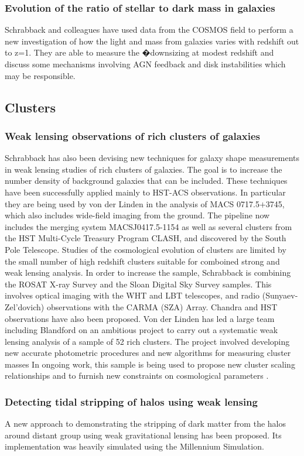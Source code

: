 \documentclass[psfig,11pt]{article}
\begin{document}
{\subsubsection{Evolution of the ratio of stellar to dark mass in galaxies}
Schrabback and colleagues have used data from the COSMOS field to perform a new investigation of how the light and mass from galaxies varies with redshift out to z=1. They are able to measure the �downsizing at modest redshift and discuss some mechanisms involving AGN feedback and disk instabilities which may be responsible.
\subsection{Clusters}
\subsubsection{Weak lensing observations of rich clusters of galaxies}
Schrabback has also been devising new techniques for galaxy shape measurements in weak lensing studies of rich clusters of galaxies. The goal is to increase the number density of background galaxies that can be included. These techniques have been successfully applied mainly to HST-ACS observations. In particular they are being used by von der Linden in the analysis of MACS 0717.5$+$3745, which also includes wide-field imaging from the ground. The pipeline now includes the merging system MACSJ0417.5-1154 as well as several clusters from the HST Multi-Cycle Treasury Program CLASH, and discovered by the South Pole Telescope. Studies of the cosmological evolution of clusters are limited by the small number of high redshift clusters suitable for comboined strong and weak lensing analysis. In order to increase the sample, Schrabback is combining the ROSAT X-ray Survey and the Sloan Digital Sky Survey samples. This involves optical imaging with the WHT and LBT telescopes, and radio (Sunyaev-Zel'dovich) observations with the CARMA (SZA) Array. Chandra and HST observations have also been proposed. Von der Linden has led a large team including Blandford on an ambitious project to carry out a systematic weak lensing analysis of a sample of 52 rich clusters. The project involved developing  new accurate photometric procedures and  new algorithms for measuring cluster masses In ongoing work, this sample is being used to propose new cluster scaling relationships and to furnish new constraints on cosmological parameters .
\subsubsection{Detecting tidal stripping of halos using weak lensing}
A new approach to demonstrating the stripping of dark matter from the halos around distant group using weak gravitational lensing has been proposed. Its implementation was heavily simulated using the Millennium Simulation.
}
\end{document}
